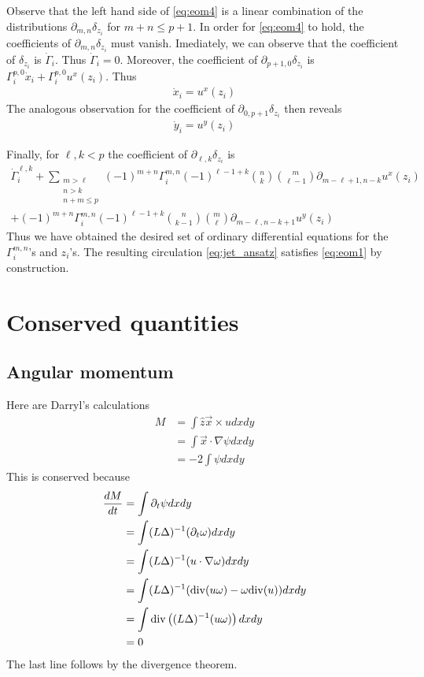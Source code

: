 \documentclass[12pt]{amsart}
\begin{document}
Observe that the left hand side of \eqref{eq:eom4}
is a linear combination of the distributions
$\partial_{m,n}\delta_{z_i}$ for $m+n \leq p+1$.
In order for \eqref{eq:eom4} to hold, the coefficients of $\partial_{m,n} \delta_{z_i}$ must vanish.
Imediately, we can observe that the coefficient of $\delta_{z_i}$ is $\dot{\Gamma}_i$.
Thus $\dot{\Gamma}_i = 0$.
Moreover, the coefficient of $\partial_{p+1,0} \delta_{z_i}$ is 
$\Gamma_i^{p,0} \dot{x}_i + \Gamma_i^{p,0} u^x(z_i)$.
Thus
\begin{align*}
  \dot{x}_i = u^x(z_i)
\end{align*}
The analogous observation for the coefficient of $\partial_{0,p+1} \delta_{z_i}$ then reveals
\begin{align*}
  \dot{y}_i = u^y(z_i)
\end{align*}

Finally, for $\ell,k < p$ the coefficient of $\partial_{\ell,k} \delta_{z_i}$ is
\begin{align*}
  \dot{\Gamma}_i^{\ell,k} + 
  \sum_{
    \substack{
      m > \ell \\
      n > k \\
      n+m \leq p}
    }(-1)^{m+n} \Gamma_i^{m,n} (-1)^{\ell -1 + k} \binom{n}{k} \binom{m}{\ell-1} \partial_{m-\ell+1,n-k} u^x(z_i) \\
  +(-1)^{m+n} \Gamma_i^{m,n} (-1)^{\ell -1 + k} \binom{n}{k-1} \binom{m}{\ell} \partial_{m-\ell,n-k+1} u^y(z_i) 
\end{align*}
Thus we have obtained the desired set of ordinary differential equations for the $\Gamma_i^{m,n}$'s and $z_i$'s.
The resulting circulation \eqref{eq:jet_ansatz} satisfies \eqref{eq:eom1} by construction.

\section{Conserved quantities}
\label{sec:conserved_quantities}

\subsection{Angular momentum}
\label{sec:angular_momentum}
Here are Darryl's calculations
\begin{align*}
  M &= \int \hat{z} \vec{x} \times u dx dy \\
  &= \int \vec{x} \cdot \nabla \psi dx dy \\
  &= -2 \int \psi dx dy 
\end{align*}
This is conserved because
\begin{align*}
  \frac{dM}{dt} &= \int \partial_t \psi dx dy\\
  &= \int (L\Delta)^{-1} (\partial_t \omega) dx dy \\
  &= \int (L \Delta)^{-1} ( u \cdot \nabla \omega) dx dy \\
  &= \int (L \Delta)^{-1} ( {\rm div}( u \omega) - \omega {\rm div}(u) ) dxdy \\
  &= \int {\rm div} \left( (L\Delta)^{-1}( u \omega) \right) dx dy \\
   &= 0
\end{align*}
The last line follows by the divergence theorem.
\end{document}
